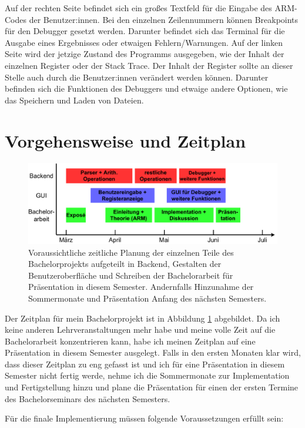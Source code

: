 \documentclass[a4paper, 11pt, onecolumn]{article}
\begin{document}
Auf der rechten Seite befindet sich ein großes Textfeld für die Eingabe des ARM-Codes der Benutzer:innen. Bei den einzelnen Zeilennummern können Breakpoints für den Debugger gesetzt werden. Darunter befindet sich das Terminal für die Ausgabe eines Ergebnisses oder etwaigen Fehlern/Warnungen. Auf der linken Seite wird der jetzige Zustand des Programms ausgegeben, wie der Inhalt der einzelnen Register oder der Stack Trace. Der Inhalt der Register sollte an dieser Stelle auch durch die Benutzer:innen verändert werden können. Darunter befinden sich die Funktionen des Debuggers und etwaige andere Optionen, wie das Speichern und Laden von Dateien.


\section{Vorgehensweise und Zeitplan}

\begin{figure}[!htb]	
	\includegraphics[width=0.8\paperwidth]{data/timeline}
	\caption{Voraussichtliche zeitliche Planung der einzelnen Teile des Bachelorprojekts aufgeteilt in Backend, Gestalten der Benutzeroberfläche und Schreiben der Bachelorarbeit für Präsentation in diesem Semester. Andernfalls Hinzunahme der Sommermonate und Präsentation Anfang des nächsten Semesters.}
	\label{timeline}
\end{figure}

Der Zeitplan für mein Bachelorprojekt ist in Abbildung \ref{timeline} abgebildet. Da ich keine anderen Lehrveranstaltungen mehr habe und meine volle Zeit auf die Bachelorarbeit konzentrieren kann, habe ich meinen Zeitplan auf eine Präsentation in diesem Semester ausgelegt. Falls in den ersten Monaten klar wird, dass dieser Zeitplan zu eng gefasst ist und ich für eine Präsentation in diesem Semester nicht fertig werde, nehme ich die Sommermonate zur Implementation und Fertigstellung hinzu und plane die Präsentation für einen der ersten Termine des Bachelorseminars des nächsten Semesters.

Für die finale Implementierung müssen folgende Voraussetzungen erfüllt sein:
\end{document}

